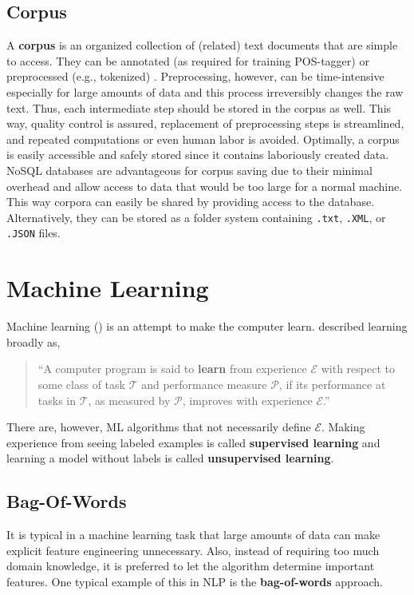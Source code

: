 \subsection{Corpus}
  A \textbf{corpus} is an organized collection of (related) text documents that are simple to access. They can be annotated (as required for training POS-tagger) or preprocessed (e.g., tokenized) \citep{Bengfort2018}.
  Preprocessing, however, can be time-intensive especially for large amounts of data and this process irreversibly changes the raw text.
  Thus, each intermediate step should be stored in the corpus as well.
  This way, quality control is assured, replacement of preprocessing steps is streamlined, and repeated computations or even human labor is avoided.
  Optimally, a corpus is easily accessible and safely stored since it contains laboriously created data.
  NoSQL databases are advantageous for corpus saving due to their minimal overhead and allow access to data that would be too large for a normal machine.
  This way corpora can easily be shared by providing access to the database.
  Alternatively, they can be stored as a folder system containing \texttt{.txt}, \texttt{.XML}, or \texttt{.JSON} files.

\section{Machine Learning}
  Machine learning () is an attempt to make the computer learn. \citeauthor{Mitchell1997} described learning broadly as,
  \begin{quote}
    ``A computer program is said to \textbf{learn} from experience $\mathcal{E}$ with respect to some class of task $\mathcal{T}$ and performance measure $\mathcal{P}$, if its performance at tasks in $\mathcal{T}$, as measured by $\mathcal{P}$, improves with experience $\mathcal{E}$.''
  \end{quote}
  There are, however, ML algorithms that not necessarily define $\mathcal{E}$.
  Making experience from seeing labeled examples is called \textbf{supervised learning} and learning a model without labels is called \textbf{unsupervised learning}.

\subsection{Bag-Of-Words}\label{section:bow}
  It is typical in a machine learning task that large amounts of data can make explicit feature engineering unnecessary.
  Also, instead of requiring too much domain knowledge, it is preferred to let the algorithm determine important features.
  One typical example of this in NLP is the \textbf{bag-of-words} approach.


